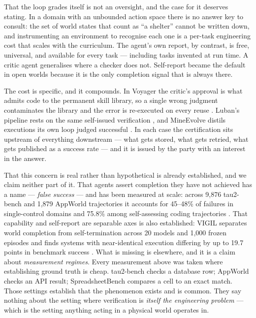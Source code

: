 \documentclass[11pt]{article}
\begin{document}
That the loop grades itself is not an oversight, and the case for it
deserves stating. In a domain with an unbounded action space there is no
answer key to consult: the set of world states that count as ``a
shelter'' cannot be written down, and instrumenting an environment to
recognise each one is a per-task engineering cost that scales with the
curriculum. The agent's own report, by contrast, is free, universal, and
available for every task --- including tasks invented at run time. A
critic agent generalises where a checker does not. Self-report became
the default in open worlds because it is the only completion signal that
is always there.

The cost is specific, and it compounds. In Voyager the critic's approval
is what admits code to the permanent skill library, so a single wrong
judgment contaminates the library and the error is re-executed on every
reuse \citep{voyager}. Luban's pipeline rests on the same self-issued
verification \citep{luban}, and MineEvolve distils executions its own
loop judged successful \citep{mineevolve}. In each case the
certification sits upstream of everything downstream --- what gets
stored, what gets retried, what gets published as a success rate --- and
it is issued by the party with an interest in the answer.

That this concern is real rather than hypothetical is already
established, and we claim neither part of it. That agents assert
completion they have not achieved has a name --- \emph{false success}
--- and has been measured at scale: across 9,876 tau2-bench and 1,879
AppWorld trajectories it accounts for 45--48\% of failures in
single-control domains and 75.8\% among self-assessing coding
trajectories \citep{falsesuccess}. That capability and self-report are
separable axes is also established: VIGIL separates world completion
from self-termination across 20 models and 1,000 frozen episodes and
finds systems with near-identical execution differing by up to 19.7
points in benchmark success \citep{vigil}. What is missing is elsewhere,
and it is a claim about \emph{measurement regimes}. Every measurement
above was taken where establishing ground truth is cheap. tau2-bench
checks a database row; AppWorld checks an API result; SpreadsheetBench
compares a cell to an exact match. Those settings establish that the
phenomenon exists and is common. They say nothing about the setting
where verification is \emph{itself the engineering problem} --- which is
the setting anything acting in a physical world operates in.
\end{document}
